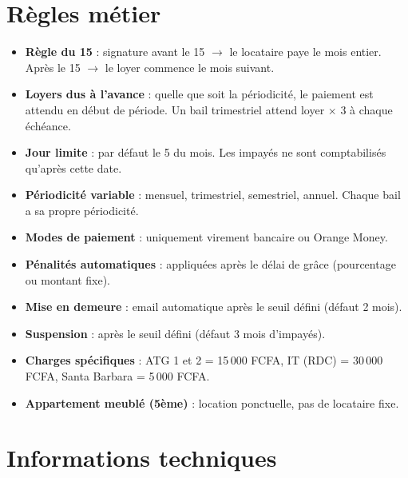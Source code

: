 \documentclass[12pt,a4paper]{article}
\begin{document}
\newpage
\section{R\`egles m\'etier}

\begin{itemize}
\item \textbf{R\`egle du 15} : signature avant le 15 $\rightarrow$ le locataire paye le mois entier. Apr\`es le 15 $\rightarrow$ le loyer commence le mois suivant.

\item \textbf{Loyers dus \`a l'avance} : quelle que soit la p\'eriodicit\'e, le paiement est attendu en d\'ebut de p\'eriode. Un bail trimestriel attend loyer $\times$ 3 \`a chaque \'ech\'eance.

\item \textbf{Jour limite} : par d\'efaut le 5 du mois. Les impay\'es ne sont comptabilis\'es qu'apr\`es cette date.

\item \textbf{P\'eriodicit\'e variable} : mensuel, trimestriel, semestriel, annuel. Chaque bail a sa propre p\'eriodicit\'e.

\item \textbf{Modes de paiement} : uniquement virement bancaire ou Orange Money.

\item \textbf{P\'enalit\'es automatiques} : appliqu\'ees apr\`es le d\'elai de gr\^ace (pourcentage ou montant fixe).

\item \textbf{Mise en demeure} : email automatique apr\`es le seuil d\'efini (d\'efaut 2 mois).

\item \textbf{Suspension} : apr\`es le seuil d\'efini (d\'efaut 3 mois d'impay\'es).

\item \textbf{Charges sp\'ecifiques} : ATG 1 et 2 = 15\,000 FCFA, IT (RDC) = 30\,000 FCFA, Santa Barbara = 5\,000 FCFA.

\item \textbf{Appartement meubl\'e (5\`eme)} : location ponctuelle, pas de locataire fixe.
\end{itemize}

\section{Informations techniques}
\end{document}

